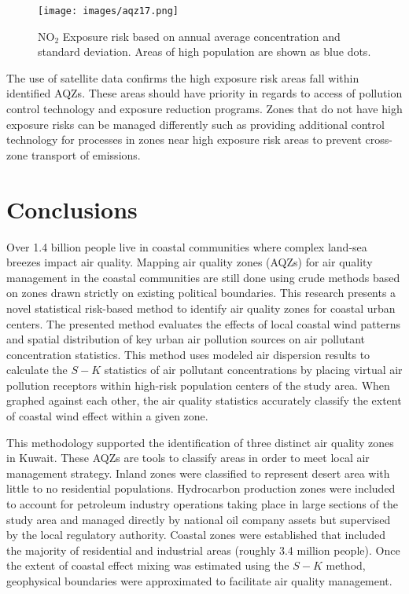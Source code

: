 %
\begin{figure}
\texttt{[image: images/aqz17.png]} 
\caption[NO$_{2}$ Exposure risk based on annual average concentration and standard deviation]{NO$_{2}$ Exposure risk based on annual average concentration and standard deviation. Areas of high population are shown as blue dots.}
\label{fig:176riskNO2}
\end{figure}
%

The use of satellite data confirms the high exposure risk areas fall within identified AQZs.  These areas should have priority in regards to access of pollution control technology and exposure reduction programs.  Zones that do not have high exposure risks can be managed differently such as providing additional control technology for processes in zones near high exposure risk areas to prevent cross-zone transport of emissions. 

\section{Conclusions}

Over 1.4 billion people live in coastal communities where complex land-sea breezes impact air quality.  Mapping air quality zones (AQZs) for air quality management in the coastal communities are still done using crude methods based on zones drawn strictly on existing political boundaries. This research presents a novel statistical risk-based method to identify air quality zones for coastal urban centers. The presented method evaluates the effects of local coastal wind patterns and spatial distribution of key urban air pollution sources on air pollutant concentration statistics.  This method uses modeled air dispersion results to calculate the $S-K$ statistics of air pollutant concentrations by placing virtual air pollution receptors within high-risk population centers of the study area.  When graphed against each other, the air quality statistics accurately classify the extent of coastal wind effect within a given zone.
 
This methodology supported the identification of three distinct air quality zones in Kuwait.  These AQZs are tools to classify areas in order to meet local air management strategy.  Inland zones were classified to represent desert area with little to no residential populations.  Hydrocarbon production zones were included to account for petroleum industry operations taking place in large sections of the study area and managed directly by national oil company assets but supervised by the local regulatory authority.  Coastal zones were established that included the majority of residential and industrial areas (roughly 3.4 million people).  Once the extent of coastal effect mixing was estimated using the $S-K$ method, geophysical boundaries were approximated to facilitate air quality management. 

